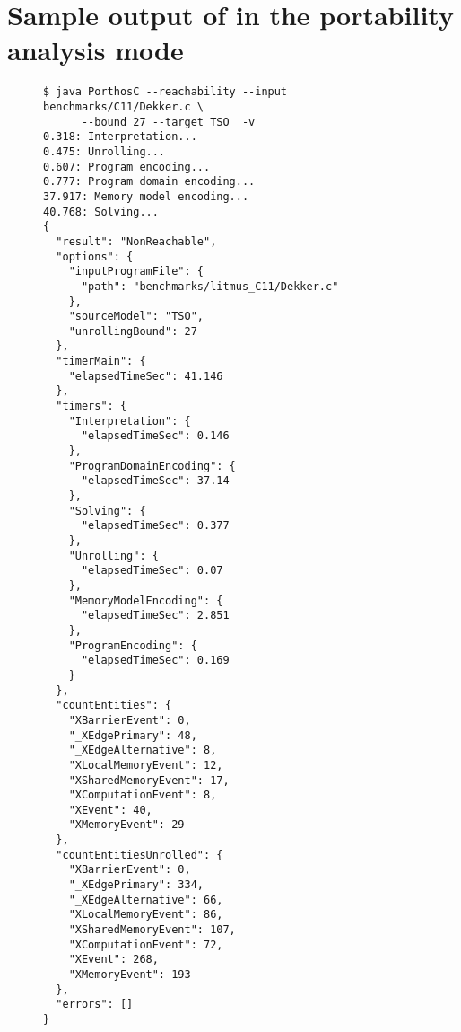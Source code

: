 \section{Sample output of \porthos[2] in the portability analysis mode}
\label{apx:output}

\begin{figure}[H]
\centering
\begin{lstlisting}[basicstyle=\scriptsize\ttfamily]
$ java PorthosC --reachability --input benchmarks/C11/Dekker.c \
      --bound 27 --target TSO  -v
0.318: Interpretation...
0.475: Unrolling...
0.607: Program encoding...
0.777: Program domain encoding...
37.917: Memory model encoding...
40.768: Solving...
{
  "result": "NonReachable",
  "options": {
    "inputProgramFile": {
      "path": "benchmarks/litmus_C11/Dekker.c"
    },
    "sourceModel": "TSO",
    "unrollingBound": 27
  },
  "timerMain": {
    "elapsedTimeSec": 41.146
  },
  "timers": {
    "Interpretation": {
      "elapsedTimeSec": 0.146
    },
    "ProgramDomainEncoding": {
      "elapsedTimeSec": 37.14
    },
    "Solving": {
      "elapsedTimeSec": 0.377
    },
    "Unrolling": {
      "elapsedTimeSec": 0.07
    },
    "MemoryModelEncoding": {
      "elapsedTimeSec": 2.851
    },
    "ProgramEncoding": {
      "elapsedTimeSec": 0.169
    }
  },
  "countEntities": {
    "XBarrierEvent": 0,
    "_XEdgePrimary": 48,
    "_XEdgeAlternative": 8,
    "XLocalMemoryEvent": 12,
    "XSharedMemoryEvent": 17,
    "XComputationEvent": 8,
    "XEvent": 40,
    "XMemoryEvent": 29
  },
  "countEntitiesUnrolled": {
    "XBarrierEvent": 0,
    "_XEdgePrimary": 334,
    "_XEdgeAlternative": 66,
    "XLocalMemoryEvent": 86,
    "XSharedMemoryEvent": 107,
    "XComputationEvent": 72,
    "XEvent": 268,
    "XMemoryEvent": 193
  },
  "errors": []
}
\end{lstlisting}
\end{figure}
%
